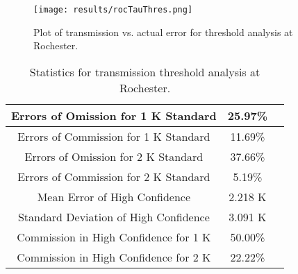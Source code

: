 \documentclass{book}
\begin{document}
\begin{minipage}[c]{0.47\textwidth}
\centering
\begin{figure}[H]
\texttt{[image: results/rocTauThres.png]}
\caption{Plot of transmission vs. actual error for threshold analysis at Rochester.}
\label{fig:rocTauThres}
\end{figure}
\end{minipage}
\begin{minipage}[c]{0.47\textwidth}
\begin{table}[H]
\centering
\footnotesize
\begin{tabular}{ | c | c | c | } \hline
Errors of Omission for 1 K Standard & 25.97\% \\ \hline
Errors of Commission for 1 K Standard & 11.69\% \\ \hline
Errors of Omission for 2 K Standard & 37.66\% \\ \hline
Errors of Commission for 2 K Standard & 5.19\% \\ \hline
Mean Error of High Confidence & 2.218 K \\ \hline
Standard Deviation of High Confidence & 3.091 K \\ \hline
Commission in High Confidence for 1 K & 50.00\% \\ \hline
Commission in High Confidence for 2 K & 22.22\% \\ \hline
\end{tabular}
\caption{Statistics for transmission threshold analysis at Rochester.}
\label{tab:rocTauThres}
\end{table}
\end{minipage}
\end{document}
